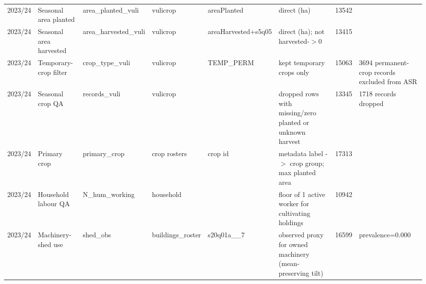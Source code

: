 \begin{tabular}{llllllrl}
 2023/24         & Seasonal area planted     & area\_planted\_vuli         & vulicrop                         & areaPlanted                               & direct (ha)                                                                                                  &   13542 &                                                                                                \\
 2023/24         & Seasonal area harvested   & area\_harvested\_vuli       & vulicrop                         & areaHarvested+s5q05                       & direct (ha); not harvested-\ensuremath{>}0                                                                                &   13415 &                                                                                                \\
 2023/24         & Temporary-crop filter     & crop\_type\_vuli            & vulicrop                         & TEMP\_PERM                                 & kept temporary crops only                                                                                    &   15063 & 3694 permanent-crop records excluded from ASR                                                  \\
 2023/24         & Seasonal crop QA          & records\_vuli              & vulicrop                         &                                           & dropped rows with missing/zero planted or unknown harvest                                                    &   13345 & 1718 records dropped                                                                           \\
 2023/24         & Primary crop              & primary\_crop              & crop rosters                     & crop id                                   & metadata label -\ensuremath{>} crop group; max planted area                                                               &   17313 &                                                                                                \\
 2023/24         & Household labour QA       & N\_hum\_working             & household                        &                                           & floor of 1 active worker for cultivating holdings                                                            &   10942 &                                                                                                \\
 2023/24         & Machinery-shed use        & shed\_obs                  & buildings\_roster                 & s20q01a\_\_7                                & observed proxy for owned machinery (mean-preserving tilt)                                                    &   16599 & prevalence=0.000                                                                               \\

\end{tabular}
